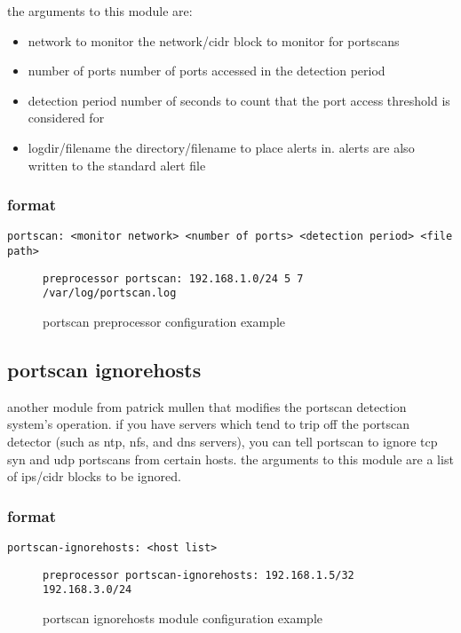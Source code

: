 \documentclass[english]{report}
\begin{document}
the arguments to this module are: 

\begin{itemize}
\item network to monitor the network/cidr block to monitor for portscans 
\item number of ports number of ports accessed in the detection period 
\item detection period number of seconds to count that the port access threshold
is considered for 
\item logdir/filename the directory/filename to place alerts in. alerts
are also written to the standard alert file
\end{itemize}

\subsubsection{format}

\begin{verbatim}
portscan: <monitor network> <number of ports> <detection period> <file path>
\end{verbatim}
%
\begin{figure}[!hbpt]
\begin{verbatim}
preprocessor portscan: 192.168.1.0/24 5 7 /var/log/portscan.log
\end{verbatim}

\caption{\label{portscan processor config}portscan preprocessor configuration
example}
\end{figure}



\subsection{portscan ignorehosts}

another module from patrick mullen that modifies the portscan detection
system's operation. if you have servers which tend to trip off the
portscan detector (such as ntp, nfs, and dns servers), you can tell
portscan to ignore tcp syn and udp portscans from certain hosts. the
arguments to this module are a list of ips/cidr blocks to be ignored.


\subsubsection{format}

\begin{verbatim}
portscan-ignorehosts: <host list>
\end{verbatim}
%
\begin{figure}[!hbpt]
\begin{verbatim}
preprocessor portscan-ignorehosts: 192.168.1.5/32 192.168.3.0/24
\end{verbatim}

\caption{\label{portscan ignore hosts example}portscan ignorehosts module
configuration example}
\end{figure}
\end{document}
